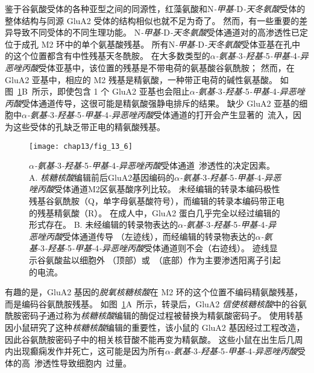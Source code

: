 鉴于谷氨酸受体的各种亚型之间的同源性，红藻氨酸和N\textit{-甲基-}D\textit{-天冬氨酸}受体的整体结构与同源 GluA2 受体的结构相似也就不足为奇了。
然而，有一些重要的差异导致不同受体的不同生理功能。 
N\textit{-甲基-}D\textit{-天冬氨酸}受体通道对的高渗透性已定位于成孔 M2 环中的单个氨基酸残基。
所有N\textit{-甲基-}D\textit{-天冬氨酸}受体亚基在孔中的这个位置都含有中性残基天冬酰胺。
在大多数类型的\textit{$\alpha$-氨基-}3\textit{-羟基-}5\textit{-甲基-}4\textit{-异恶唑丙酸}受体亚基中，该位置的残基是不带电荷的氨基酸谷氨酰胺；
然而，在 GluA2 亚基中，相应的 M2 残基是精氨酸，一种带正电荷的碱性氨基酸。
如图~\ref{fig:13_6}B~所示，即使包含 1 个 GluA2 亚基也会阻止\textit{$\alpha$-氨基-}3\textit{-羟基-}5\textit{-甲基-}4\textit{-异恶唑丙酸}受体通道传导，这很可能是精氨酸强静电排斥的结果。
缺少 GluA2 亚基的细胞中\textit{$\alpha$-氨基-}3\textit{-羟基-}5\textit{-甲基-}4\textit{-异恶唑丙酸}受体通道的打开会产生显著的~流入，因为这些受体的孔缺乏带正电的精氨酸残基。


\begin{figure}[htbp]
	\centering
	\texttt{[image: chap13/fig\_13\_6]}
	\caption{\textit{$\alpha$-氨基-}3\textit{-羟基-}5\textit{-甲基-}4\textit{-异恶唑丙酸}受体通道~渗透性的决定因素。
		A. \textit{核糖核酸}编辑前后GluA2基因编码的\textit{$\alpha$-氨基-}3\textit{-羟基-}5\textit{-甲基-}4\textit{-异恶唑丙酸}受体通道M2区氨基酸序列比较。
		未经编辑的转录本编码极性残基谷氨酰胺（Q，单字母氨基酸符号），而编辑的转录本编码带正电的残基精氨酸（R）。
		在成人中，GluA2 蛋白几乎完全以经过编辑的形式存在。
		B. 未经编辑的转录物表达的\textit{$\alpha$-氨基-}3\textit{-羟基-}5\textit{-甲基-}4\textit{-异恶唑丙酸}受体通道传导 （左迹线），而经编辑的转录物表达的\textit{$\alpha$-氨基-}3\textit{-羟基-}5\textit{-甲基-}4\textit{-异恶唑丙酸}受体通道则不会（右迹线）。
		迹线显示谷氨酸盐以细胞外 （顶部）或~（底部）作为主要渗透阳离子引起的电流\cite{sakmann1992nobel}。}
	\label{fig:13_6}
\end{figure}


有趣的是，GluA2 基因的\textit{脱氧核糖核酸}在 M2 环的这个位置不编码精氨酸残基，而是编码谷氨酰胺残基。
如图~\ref{fig:13_6}A~所示，转录后，GluA2 \textit{信使核糖核酸}中的谷氨酰胺密码子通过称为\textit{核糖核酸}编辑的酶促过程被替换为精氨酸密码子。
使用转基因小鼠研究了这种\textit{核糖核酸}编辑的重要性，该小鼠的 GluA2 基因经过工程改造，因此谷氨酰胺密码子中的相关核苷酸不能再变为精氨酸。
这些小鼠在出生后几周内出现癫痫发作并死亡，这可能是因为所有\textit{$\alpha$-氨基-}3\textit{-羟基-}5\textit{-甲基-}4\textit{-异恶唑丙酸}受体的高~渗透性导致细胞内~过量。



